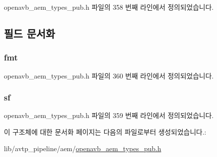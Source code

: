 openavb\+\_\+aem\+\_\+types\+\_\+pub.\+h 파일의 358 번째 라인에서 정의되었습니다.



\subsection{필드 문서화}
\subsubsection[{\texorpdfstring{fmt}{fmt}}]{ fmt}\hypertarget{structopenavb__aem__stream__format__iec__61883__4__t_ab88030d1822b822615cede2168f1c31e}{}\label{structopenavb__aem__stream__format__iec__61883__4__t_ab88030d1822b822615cede2168f1c31e}


openavb\+\_\+aem\+\_\+types\+\_\+pub.\+h 파일의 360 번째 라인에서 정의되었습니다.

\subsubsection[{\texorpdfstring{sf}{sf}}]{ sf}\hypertarget{structopenavb__aem__stream__format__iec__61883__4__t_a153db177c2b7653917dff143e5f755e1}{}\label{structopenavb__aem__stream__format__iec__61883__4__t_a153db177c2b7653917dff143e5f755e1}


openavb\+\_\+aem\+\_\+types\+\_\+pub.\+h 파일의 359 번째 라인에서 정의되었습니다.



이 구조체에 대한 문서화 페이지는 다음의 파일로부터 생성되었습니다.\+:\begin{DoxyCompactItemize}
\item 
lib/avtp\+\_\+pipeline/aem/\hyperlink{openavb__aem__types__pub_8h}{openavb\+\_\+aem\+\_\+types\+\_\+pub.\+h}\end{DoxyCompactItemize}
